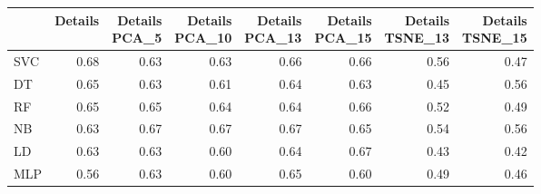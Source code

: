 \documentclass[12pt,italian]{report}
\begin{document}
\begin{table}[h]
	\begin{center}
		\begin{adjustbox}{max width=\textwidth, max totalheight= {4cm}}
			\begin{tabular}{lrrrrrrr}
				\toprule
				{} &   Details &  \thead{Details\\PCA\_5} &  \thead{Details\\PCA\_10} &  \thead{Details\\PCA\_13} &  \thead{Details\\PCA\_15} &  \thead{Details\\TSNE\_13} &  \thead{Details\\TSNE\_15} \\
				\midrule
				SVC &  0.68 &                  0.63 &                   0.63 &                   0.66 &                   0.66 &                    0.56 &                    0.47 \\
				DT  &  0.65 &                  0.63 &                   0.61 &                   0.64 &                   0.63 &                    0.45 &                    0.56 \\
				RF  &  0.65 &                  0.65 &                   0.64 &                   0.64 &                   0.66 &                    0.52 &                    0.49 \\
				NB  &  0.63 &                  0.67 &                   0.67 &                   0.67 &                   0.65 &                    0.54 &                    0.56 \\
				LD  &  0.63 &                  0.63 &                   0.60 &                   0.64 &                   0.67 &                    0.43 &                    0.42 \\
				MLP &  0.56 &                  0.63 &                   0.60 &                   0.65 &                   0.60 &                    0.49 &                    0.46 \\
				\bottomrule
			\end{tabular}
		\end{adjustbox}
	\end{center}
\end{table}
\end{document}
